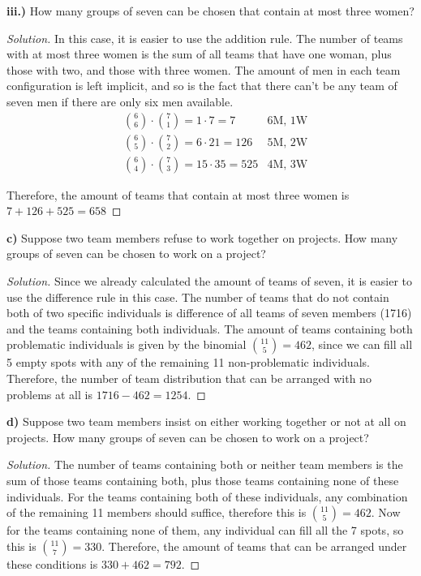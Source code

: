 \documentclass[titlepage, letterpaper, fleqn]{article}
\newcommand{\spacepls}{\vspace{5mm}}
\renewcommand\qedsymbol{\(\blacksquare\)}
\newenvironment{solution}
{\renewcommand\qedsymbol{$\square$}\begin{proof}[Solution]}
{\end{proof}}
\begin{document}
{\large \textbf{iii.)} How many groups of seven can be chosen that contain at most three women?}
\begin{solution}
In this case, it is easier to use the addition rule.
The number of teams with at most three women is the sum of all teams that have one woman, plus those with two, and those with three women. The amount of men in each team configuration is left implicit, and so is the fact that there can't be any team of seven men if there are only six men available.
\begin{align*}
& \binom{6}{6} \cdot \binom{7}{1} = 1 \cdot 7 = 7 & \text{6M, 1W}
\\ & \binom{6}{5} \cdot \binom{7}{2} = 6 \cdot 21 = 126 & \text{5M, 2W}
\\ & \binom{6}{4} \cdot \binom{7}{3} = 15 \cdot 35 = 525 & \text{4M, 3W}
\end{align*}

Therefore, the amount of teams that contain at most three women is \(7 + 126 + 525 = 658\)
\end{solution}
\spacepls

{\large \textbf{c)} Suppose two team members refuse to work together on projects. How many groups of seven can be chosen to work on a project?}

\begin{solution}
Since we already calculated the amount of teams of seven, it is easier to use the difference rule in this case.
The number of teams that do not contain both of two specific individuals is difference of all teams of seven members (1716) and the teams containing both individuals.
The amount of teams containing both problematic individuals is given by the binomial \(\binom{11}{5} = 462\), since we can fill all 5 empty spots with any of the remaining 11 non-problematic individuals.
Therefore, the number of team distribution that can be arranged with no problems at all is \(1716 - 462 = 1254\).
\end{solution}

\spacepls

{\large \textbf{d)} Suppose two team members insist on either working together or not at all on projects. How many groups of seven can be chosen to work on a project?}

\begin{solution}
The number of teams containing both or neither team members is the sum of those teams containing both, plus those teams containing none of these individuals.
For the teams containing both of these individuals, any combination of the remaining 11 members should suffice, therefore this is \(\binom{11}{5} = 462\).
Now for the teams containing none of them, any individual can fill all the 7 spots, so this is \(\binom{11}{7} = 330\).
Therefore, the amount of teams that can be arranged under these conditions is \(330 + 462 = 792\).

\end{solution}
\end{document}
